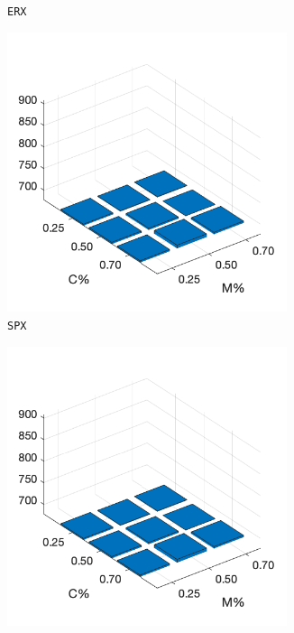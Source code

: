 \begin{figure}
\begin{subfigure}[b]{0.25\textwidth}
		\caption{\texttt{ERX}}
		\label{fig:y}
    	\end{subfigure}
%
	\begin{subfigure}[b]{0.25\textwidth}
		\centering
		\includegraphics[width=0.9\textwidth]{crossover/cross_unnamed_1.png}
		\caption{\texttt{SPX}}
		\label{fig:z}
    	\end{subfigure}
%
	\begin{subfigure}[b]{0.25\textwidth}
		\centering
		\includegraphics[width=0.9\textwidth]{crossover/cross_unnamed_1.png}

\end{subfigure}
\end{figure}
